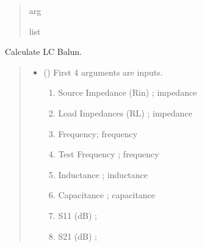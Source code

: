 \documentclass[letterpaper,10pt,english]{sphinxmanual}
\begin{document}
\begin{fulllineitems}
\begin{quote}
\begin{description}
\begin{itemize}
\end{itemize}

\sphinxAtStartPar
arg

\sphinxAtStartPar
list

\end{description}\end{quote}

\end{fulllineitems}


\begin{fulllineitems}
\label{\detokenize{components:components.LC_Balun}}
\pysigstartsignatures
{}
\pysigstopsignatures
\sphinxAtStartPar
Calculate LC Balun.
\begin{quote}\begin{description}
\begin{itemize}
\item {}
\sphinxAtStartPar
{} () \textendash{}
\sphinxAtStartPar
First 4 arguments are inputs.
\begin{enumerate}
%
\item {}
\sphinxAtStartPar
Source Impedance (Rin) ; impedance

\item {}
\sphinxAtStartPar
Load Impedances (RL) ; impedance

\item {}
\sphinxAtStartPar
Frequency; frequency

\item {}
\sphinxAtStartPar
Test Frequency ; frequency

\item {}
\sphinxAtStartPar
Inductance ; inductance

\item {}
\sphinxAtStartPar
Capacitance ; capacitance

\item {}
\sphinxAtStartPar
S11 (dB) ;

\item {}
\sphinxAtStartPar
S21 (dB) ;


\end{enumerate}
\end{itemize}
\end{description}
\end{quote}
\end{fulllineitems}
\end{document}
